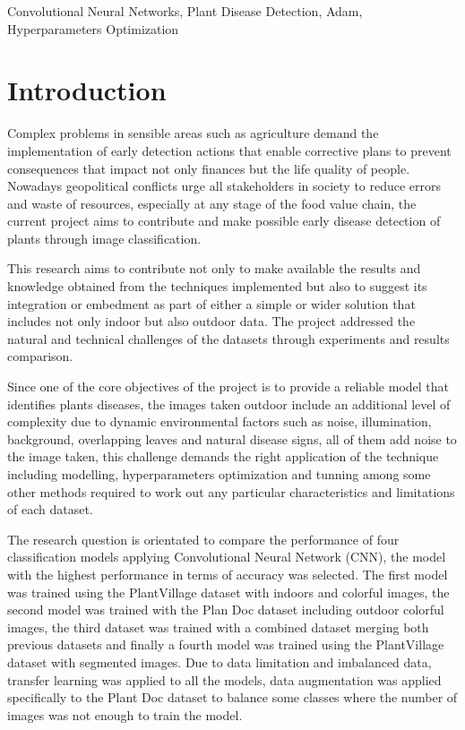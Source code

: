 \documentclass[conference]{IEEEtran}
\begin{document}
\begin{IEEEkeywords}
Convolutional Neural Networks, Plant Disease Detection, Adam, Hyperparameters Optimization 
\end{IEEEkeywords}

\section{Introduction}
Complex problems in sensible areas such as agriculture demand the implementation of early detection actions that enable corrective plans to prevent consequences that impact not only finances but the life quality of people. Nowadays geopolitical conflicts urge all stakeholders in society to reduce errors and waste of resources, especially at any stage of the food value chain, the current project aims to contribute and make possible early disease detection of plants through image classification. \

This research aims to contribute not only to make available the results and knowledge obtained from the techniques implemented but also to suggest its integration or embedment as part of either a simple or wider solution that includes not only indoor but also outdoor data. The project addressed the natural and technical challenges of the datasets through experiments and results comparison. \

Since one of the core objectives of the project is to provide a reliable model that identifies plants diseases, the images taken outdoor include an additional level of complexity due to dynamic environmental factors such as noise, illumination, background, overlapping leaves and natural disease signs, all of them add noise to the image taken, this challenge demands the right application of the technique including modelling, hyperparameters optimization and tunning among some other methods required to work out any particular characteristics and limitations of each dataset. \

The research question is orientated to compare the performance of four classification models applying Convolutional Neural Network (CNN), the model with the highest performance in terms of accuracy was selected. The first model was trained using the PlantVillage dataset with indoors and colorful images, the second model was trained with the Plan Doc dataset including outdoor colorful images, the third dataset was trained with a combined dataset merging both previous datasets and finally a fourth model was trained using the PlantVillage dataset with segmented images. Due to data limitation and imbalanced data, transfer learning was applied to all the models, data augmentation was applied specifically to the Plant Doc dataset to balance some classes where the number of images was not enough to train the model. \
\end{document}
